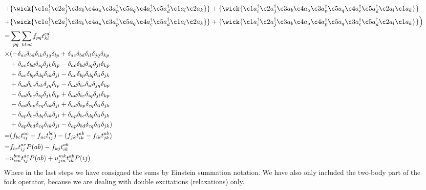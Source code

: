 \documentclass[
    a4paper, aps, twocolumn, floatfix, superscriptaddress,
    nofootinbib]{revtex4-1}
\newcommand{\1}{\mathds{1}}
\begin{document}
\begin{equation}
\begin{aligned}
		        + &\{\wick{\c1 a^\dagger_i \c2 a^\dagger_j \c3 a_b \c4 a_a \c3 a^\dagger_p \c5 a_q \c4 a^\dagger_c \c5 a^\dagger_d \c1 a_l \c2 a_k } \}
		          +\{\wick{\c1 a^\dagger_i \c2 a^\dagger_j \c3 a_b \c4 a_a \c3 a^\dagger_p \c5 a_q \c4 a^\dagger_c \c5 a^\dagger_d \c2 a_l \c1 a_k } \} \\
		        + &\{\wick{\c1 a^\dagger_i \c2 a^\dagger_j \c3 a_b \c4 a_a \c3 a^\dagger_p \c5 a_q \c4 a^\dagger_c \c5 a^\dagger_d \c1 a_l \c2 a_k } \}
		          + \{\wick{\c1 a^\dagger_i \c2 a^\dagger_j \c3 a_b \c4 a_a \c4 a^\dagger_p \c5 a_q \c3 a^\dagger_c \c5 a^\dagger_d \c2 a_l \c1 a_k } \}
				\Big) \\
				=& \sum_{pq}\sum_{klcd}f_{pq} t_{kl}^{cd} \\
				\times&( - \delta_{a c} \delta_{b d} \delta_{i k} \delta_{j q} \delta_{l p} + \delta_{a c} \delta_{b d} \delta_{i l} \delta_{j q} \delta_{k p}  \\
				 \ &+ \delta_{a c} \delta_{b d} \delta_{i q} \delta_{j k} \delta_{l p} - \delta_{a c} \delta_{b d} \delta_{i q} \delta_{j l} \delta_{k p} \\
				 \ &+ \delta_{a c} \delta_{b p} \delta_{d q} \delta_{i k} \delta_{j l} - \delta_{a c} \delta_{b p} \delta_{d q} \delta_{i l} \delta_{j k} \\
				 \ & + \delta_{a d} \delta_{b c} \delta_{i k} \delta_{j q} \delta_{l p} - \delta_{a d} \delta_{b c} \delta_{i l} \delta_{j q} \delta_{k p} \\
				 \ &- \delta_{a d} \delta_{b c} \delta_{i q} \delta_{j k} \delta_{l p} + \delta_{a d} \delta_{b c} \delta_{i q} \delta_{j l} \delta_{k p} \\
				 \ &- \delta_{a d} \delta_{b p} \delta_{c q} \delta_{i k} \delta_{j l} + \delta_{a d} \delta_{b p} \delta_{c q} \delta_{i l} \delta_{j k} \\
				 \ &- \delta_{a p} \delta_{b c} \delta_{d q} \delta_{i k} \delta_{j l} + \delta_{a p} \delta_{b c} \delta_{d q} \delta_{i l} \delta_{j k} \\
				 \ &+ \delta_{a p} \delta_{b d} \delta_{c q} \delta_{i k} \delta_{j l} - \delta_{a p} \delta_{b d} \delta_{c q} \delta_{i l} \delta_{j k}) \\
				 =& (f_{bc}t^{ac}_{ij} - f_{ac}t^{bc}_{ij}) - (f_{jk}t^{ab}_{ik} - f_{ik}t^{ab}_{jk}) \\
				 =& f_{bc}t^{ac}_{ij}P(ab) - f_{kj}t^{ab}_{ik} \\
				 =& u_{cm}^{bm}t_{ij}^{ac}P(ab) + u_{jm}^{mk}t_{ik}^{ab}P(ij)
		\end{aligned}
		\end{equation}		
		Where in the last steps we have consigned the sums by Einstein summation notation.
		We have also only included the two-body part of the fock operator, because we are
		dealing with double excitations (relaxations) only.
		
\end{document}
